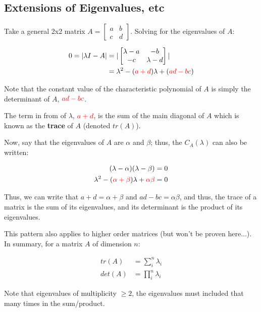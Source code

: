 \documentclass[12pt]{article}
\begin{document}
{\subsection{Extensions of Eigenvalues, etc}

Take a general 2x2 matrix $A = \begin{bmatrix}
    a & b\\
    c & d
\end{bmatrix}$. Solving for the eigenvalues of $A$:

\begin{align*}
    0 = |\lambda I - A| &= |\begin{bmatrix}
        \lambda - a & -b\\
        -c & \lambda - d
    \end{bmatrix}|\\
    &= \lambda^2 - (\textcolor{red}{a+d})\lambda + (\textcolor{red}{ad - bc})\\
\end{align*}

Note that the constant value of the characteristic polynomial of $A$ is simply the determinant of $A$, $\textcolor{red}{ad - bc}$.

The term in from of $\lambda$, $\textcolor{red}{a+d}$, is the sum of the main diagonal of $A$ which is known as the \textbf{trace} of $A$ (denoted $tr(A)$). 

Now, say that the eigenvalues of $A$ are $\alpha$ and $\beta$; thus, the $C_A(\lambda)$ can also be written:

\begin{align*}
    (\lambda - \alpha)(\lambda - \beta) &= 0\\
    \lambda^2 - (\textcolor{red}{\alpha + \beta})\lambda + \textcolor{red}{\alpha\beta} &= 0
\end{align*}
    
Thus, we can write that $a+d = \alpha + \beta$ and $ad - bc = \alpha\beta$, and thus, the trace of a matrix is the sum of its eigenvalues, and its determinant is the product of its eigenvalues. 

This pattern also applies to higher order matrices (but won't be proven here...). In summary, for a matrix $A$ of dimension $n$:

\begin{align*}
    tr(A) &= \sum_i^n \lambda_i \\
    det(A) &= \prod_i^n \lambda_i
\end{align*}

Note that eigenvalues of multiplicity $\geq 2$, the eigenvalues must included that many times in the sum/product.

}
\end{document}
